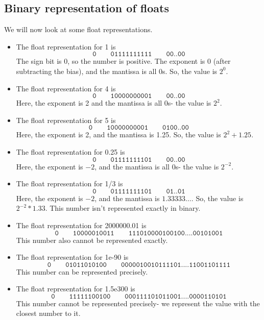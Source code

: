 \documentclass[a4paper, openany]{memoir}
\begin{document}
    \subsection{Binary representation of floats}
    We will now look at some float representations.
    \begin{itemize}
        \item The float representation for 1 is
        \[\texttt{0} \qquad \texttt{01111111111} \qquad \texttt{00..00}\]
        The sign bit is 0, so the number is positive. The exponent is 0 (after subtracting the bias), and the mantissa is all 0s. So, the value is $2^0$.

        \item The float representation for 4 is
        \[\texttt{0} \qquad \texttt{10000000001} \qquad \texttt{00..00}\]
        Here, the exponent is 2 and the mantissa is all 0s- the value is $2^2$.
        
        \item The float representation for 5 is
        \[\texttt{0} \qquad \texttt{10000000001} \qquad \texttt{0100..00}\]
        Here, the exponent is 2, and the mantissa is 1.25. So, the value is $2^2 + 1.25$.

        \item The float representation for 0.25 is
        \[\texttt{0} \qquad \texttt{01111111101} \qquad \texttt{00..00}\]
        Here, the exponent is $-2$, and the mantissa is all 0s- the value is $2^{-2}$.

        \item The float representation for 1/3 is
        \[\texttt{0} \qquad \texttt{01111111101} \qquad \texttt{01..01}\]
        Here, the exponent is $-2$, and the mantissa is $1.33333\dots$. So, the value is $2^{-2} * 1.33$. This number isn't represented exactly in binary.

        \item The float representation for 2000000.01 is
        \[\texttt{0} \qquad \texttt{10000010011} \qquad \texttt{111010000100100....00101001}\]
        This number also cannot be represented exactly.

        \item The float representation for 1e-90 is
        \[\texttt{0} \qquad \texttt{01011010100} \qquad \texttt{0000010010111101....11001101111}\]
        This number can be represented precisely.

        \item The float representation for 1.5e300 is
        \[\texttt{0} \qquad \texttt{11111100100} \qquad \texttt{000111101011001....0000110101}\]        This number cannot be represented precisely- we represent the value with the closest number to it.
    \end{itemize}
\end{document}
